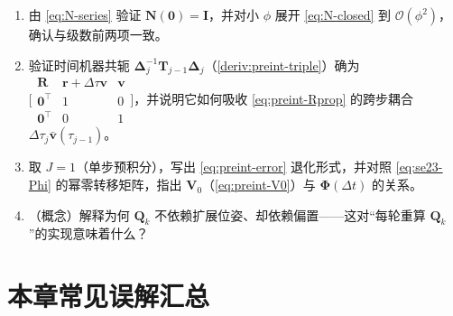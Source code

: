 \begin{practice}
\begin{enumerate}
  \item 由 \cref{eq:N-series} 验证 $\mathbf{N}(\mathbf{0})=\mathbf{I}$，并对小 $\phi$ 展开 \cref{eq:N-closed} 到 $\mathcal{O}(\phi^2)$，确认与级数前两项一致。
  \item 验证时间机器共轭 $\boldsymbol{\Delta}_j^{-1}\mathbf{T}_{j-1}\boldsymbol{\Delta}_j$（\cref{deriv:preint-triple}）确为 $\big[\begin{smallmatrix}\mathbf{R}&\mathbf{r}+\Delta\tau\mathbf{v}&\mathbf{v}\\\mathbf{0}^\top&1&0\\\mathbf{0}^\top&0&1\end{smallmatrix}\big]$，并说明它如何吸收 \cref{eq:preint-Rprop} 的跨步耦合 $\Delta\tau_j\bar{\mathbf{v}}(\tau_{j-1})$。
  \item 取 $J=1$（单步预积分），写出 \cref{eq:preint-error} 退化形式，并对照 \cref{eq:se23-Phi} 的幂零转移矩阵，指出 $\mathbf{V}_0$（\cref{eq:preint-V0}）与 $\boldsymbol{\Phi}(\Delta t)$ 的关系。
  \item （概念）解释为何 $\mathbf{Q}_k$ 不依赖扩展位姿、却依赖偏置——这对“每轮重算 $\mathbf{Q}_k$”的实现意味着什么？
\end{enumerate}
\end{practice}

\section*{本章常见误解汇总}

